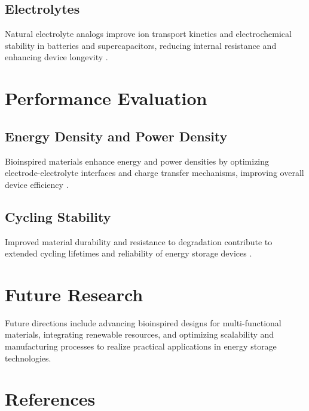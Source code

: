 \documentclass[12pt]{article}
\begin{document}
\subsection{Electrolytes}
Natural electrolyte analogs improve ion transport kinetics and electrochemical stability in batteries and supercapacitors, reducing internal resistance and enhancing device longevity \citep{jin2015bioinspired, guo2017bioinspired}.

\section{Performance Evaluation}
\subsection{Energy Density and Power Density}
Bioinspired materials enhance energy and power densities by optimizing electrode-electrolyte interfaces and charge transfer mechanisms, improving overall device efficiency \citep{liu2020bioinspired, zhang2021bioinspired}.

\subsection{Cycling Stability}
Improved material durability and resistance to degradation contribute to extended cycling lifetimes and reliability of energy storage devices \citep{cao2018bioinspired, yang2019bioinspired}.

\section{Future Research}
Future directions include advancing bioinspired designs for multi-functional materials, integrating renewable resources, and optimizing scalability and manufacturing processes to realize practical applications in energy storage technologies.

\section*{References}


\end{document}
